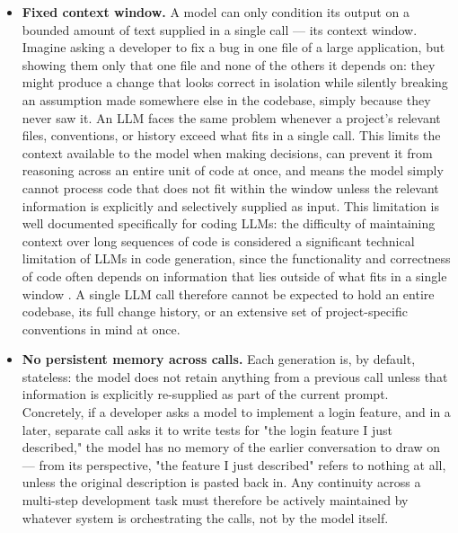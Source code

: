 \begin{itemize}
    \item \textbf{Fixed context window.} A model can only condition its output on a bounded amount of text supplied in a single call --- its context window. Imagine asking a developer to fix a bug in one file of a large application, but showing them only that one file and none of the others it depends on: they might produce a change that looks correct in isolation while silently breaking an assumption made somewhere else in the codebase, simply because they never saw it. An LLM faces the same problem whenever a project's relevant files, conventions, or history exceed what fits in a single call. This limits the context available to the model when making decisions, can prevent it from reasoning across an entire unit of code at once, and means the model simply cannot process code that does not fit within the window unless the relevant information is explicitly and selectively supplied as input. This limitation is well documented specifically for coding LLMs: the difficulty of maintaining context over long sequences of code is considered a significant technical limitation of LLMs in code generation, since the functionality and correctness of code often depends on information that lies outside of what fits in a single window \cite{holt2024l2mac}. A single LLM call therefore cannot be expected to hold an entire codebase, its full change history, or an extensive set of project-specific conventions in mind at once.

    \item \textbf{No persistent memory across calls.} Each generation is, by default, stateless: the model does not retain anything from a previous call unless that information is explicitly re-supplied as part of the current prompt. Concretely, if a developer asks a model to implement a login feature, and in a later, separate call asks it to write tests for "the login feature I just described," the model has no memory of the earlier conversation to draw on --- from its perspective, "the feature I just described" refers to nothing at all, unless the original description is pasted back in. Any continuity across a multi-step development task must therefore be actively maintained by whatever system is orchestrating the calls, not by the model itself.


\end{itemize}
